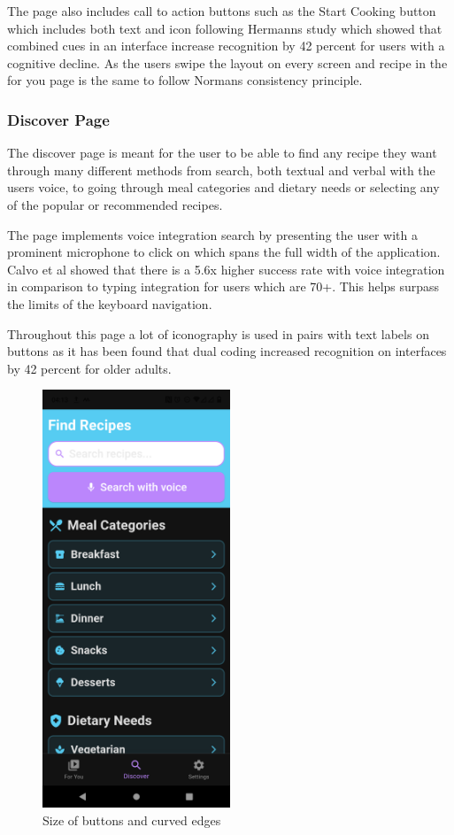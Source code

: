 \documentclass[]{project_final}
\begin{document}
The page also includes call to action buttons such as the Start Cooking button which includes both text and icon following Hermanns study which showed that combined cues in an interface increase recognition by 42 percent for users with a cognitive decline.
As the users swipe the layout on every screen and recipe in the for you page is the same to follow Normans consistency principle.

\subsubsection{Discover Page}

The discover page is meant for the user to be able to find any recipe they want through many different methods from search, both textual and verbal with the users voice, to going through meal categories and dietary needs or selecting any of the popular or recommended recipes.

The page implements voice integration search by presenting the user with a prominent microphone to click on which spans the full width of the application. Calvo et al showed that there is a 5.6x higher success rate with voice integration in comparison to typing integration for users which are 70+. This helps surpass the limits of the keyboard navigation.

Throughout this page a lot of iconography is used in pairs with text labels on buttons as it has been found that dual coding increased recognition on interfaces by 42 percent for older adults.

\begin{figure}[ht!]
  \centering
  \includegraphics[width=0.5\textwidth]{mraDiscover.png}
  \caption{Size of buttons and curved edges}
  \label{fig:1}
\end{figure}
\end{document}
